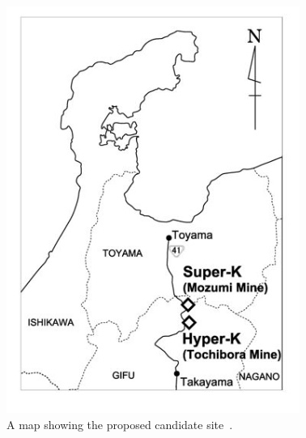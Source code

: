 \begin{figure}[h!]
\begin{minipage}[b]{0.39\textwidth}
    \includegraphics[width=\textwidth]{figures/hyperk2.jpeg}
       \vspace{2mm}
    \caption{A map showing the proposed candidate site~\cite{24HyperK}.}
     \label{fig:hyper2}
  \end{minipage}
\end{figure}

\pagebreak
